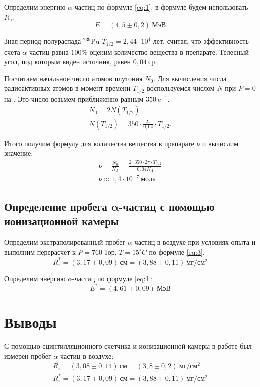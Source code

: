 \documentclass[a4paper, 12pt]{article}
\begin{document}
Определим энергию $\alpha$-частиц по формуле \eqref{eq:1}, в формуле
будем использовать $R_\text{э}$.
\[
    E = (4,5 \pm 0,2)\: \text{МэВ}
\]

Зная период полураспада $^{239} \text{Pu}$ $T_{1/2} = 2,44 \cdot 10^4$ лет,
считая, что эффективность счета $\alpha$-частиц равна $100\%$ оценим
количество вещества в препарате. Телесный угол, под которым виден
источник, равен $0,04\: \text{ср}$.


Посчитаем начальное число атомов плутония $N_0$. Для вычисления числа
радиоактивных атомов в момент времени $T _{1/2}$ воспользуемся числом
$N$ при $P = 0$ на . Это число возьмем приближенно равным
$350\: \text{c} ^{-1}$.
\begin{equation*}
    \begin{gathered}
        N_0 = 2 N(T _{1/2})\\
        N(T _{1/2}) = 350 \cdot \frac{2\pi}{0,04} \cdot T _{1/2}.
    \end{gathered}
\end{equation*}

Итого получим формулу для количества вещества в препарате $\nu$ и
вычислим значение:
\begin{equation*}
    \begin{gathered}
        \nu = \frac{N_0}{N_A} = \frac{2 \cdot 350 \cdot 2\pi \cdot T
        _{1/2}}{0,04 N_A}\\ 
        \nu \approx 1,4 \cdot 10 ^{-7}\: \text{моль}
    \end{gathered}
\end{equation*}


\subsection*{Определение пробега $\symbf{\alpha}$-частиц с помощью
ионизационной камеры}
Определим экстраполированный пробег $\alpha$-частиц в воздухе при
условиях опыта и выполним перерасчет к $P = 760\: \text{Тор}$, $T = 15
^{\circ} C$ по формуле \eqref{eq:3}. 
\[
    R^*_\text{э} = (3,17 \pm 0,09)\: \text{см} = (3,88 \pm 0,11)\:
    \text{мг}/\text{см}^2
\]

Определим энергию $\alpha$-частиц по формуле \eqref{eq:1}:
\[
    E^* = (4,61 \pm 0,09)\: \text{МэВ}
\]












\section{Выводы}
С помощью сцинтилляционного счетчика и ионизационной камеры в работе
был измерен пробег $\alpha$-частиц в воздухе:
\begin{equation*}
    \begin{gathered}
        R_\text{э} =  (3,08 \pm 0,14)\: \text{см} = (3,8 \pm 0,2)\:
         \text{мг}/\text{см}^2\\
    R^*_\text{э} = (3,17 \pm 0,09)\: \text{см} = (3,88 \pm 0,11)\:
    \text{мг}/\text{см}^2
    \end{gathered}
\end{equation*}
\end{document}
